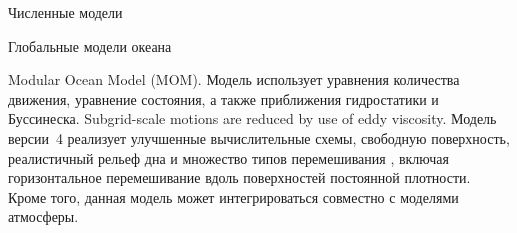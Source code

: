 \begin{chapter}{Численные модели}
\begin{section}{Глобальные модели океана}
\begin{paragraph}{Modular Ocean Model (MOM).}
Модель использует уравнения количества движения, уравнение состояния,
а также приближения гидростатики и Буссинеска. 
Subgrid-scale motions are reduced by use of eddy viscosity.
Модель версии~4 реализует улучшенные вычислительные схемы, свободную
поверхность, реалистичный рельеф дна и множество типов перемешивания%
, включая горизонтальное
перемешивание
вдоль поверхностей постоянной плотности. Кроме того, данная модель может
интегрироваться совместно с моделями атмосферы.
%
\end{paragraph}



\end{section}
\end{chapter}

